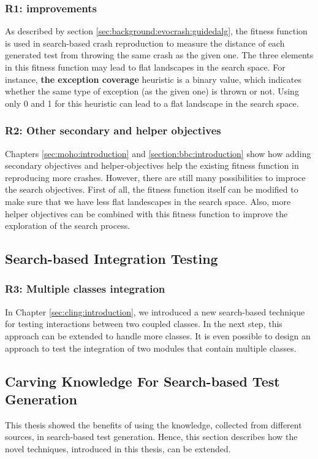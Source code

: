 \subsubsection{R1: \CrashFunction improvements}
As described by section \ref{sec:background:evocrash:guidedalg}, the \CrashFunction fitness function is used in search-based crash reproduction to measure the distance of each generated test from throwing the same crash as the given one. The three elements in this fitness function may lead to flat landscapes in the search space. For instance, \textbf{the exception coverage} heuristic is a binary value, which indicates whether the same type of exception (as the given one) is thrown or not. Using only 0 and 1 for this heuristic can lead to a flat landscape in the search space.


\subsubsection{R2: Other secondary and helper objectives}
 Chapters \ref{sec:moho:introduction} and \ref{section:bbc:introduction} show how adding secondary objectives and helper-objectives help the existing \CrashFunction fitness function in reproducing more crashes. However, there are still many possibilities to improce the search objectives. First of all, the \CrashFunction fitness function itself can be modified to make sure that we have less flat landescapes in the search space. Also, more helper objectives can be combined with this fitness function to improve the exploration of the search process.



\subsection{Search-based Integration Testing}
\subsubsection{R3: Multiple classes integration}
In Chapter \ref{sec:cling:introduction}, we introduced a new search-based technique for testing interactions between two coupled classes. In the next step, this approach can be extended to handle more classes. It is even possible to design an approach to test the integration of two modules that contain multiple classes.

\subsection{Carving Knowledge For Search-based Test Generation}
This thesis showed the benefits of using the knowledge, collected from different sources, in search-based test generation. Hence, this section describes how the novel techniques, introduced in this thesis, can be extended.

